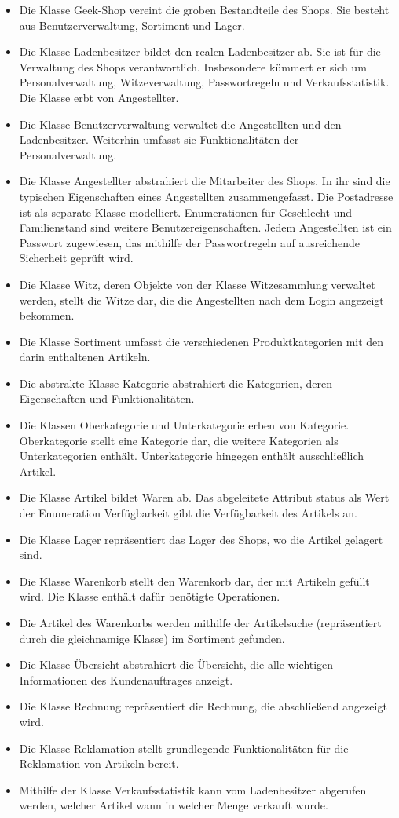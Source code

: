 \documentclass[pdftex,12pt,a4paper]{article}
\begin{document}
\begin{itemize}
\item Die Klasse Geek-Shop vereint die groben Bestandteile des Shops. Sie besteht aus Benutzerverwaltung, Sortiment und Lager.
\item Die Klasse Ladenbesitzer bildet den realen Ladenbesitzer ab. Sie ist für die Verwaltung des Shops verantwortlich. Insbesondere kümmert er sich um Personalverwaltung, Witzeverwaltung, Passwortregeln und Verkaufsstatistik. Die Klasse erbt von Angestellter.
\item Die Klasse Benutzerverwaltung verwaltet die Angestellten und den Ladenbesitzer. Weiterhin umfasst sie Funktionalit\"aten der Personalverwaltung.
\item Die Klasse Angestellter abstrahiert die Mitarbeiter des Shops. In ihr sind die typischen Eigenschaften eines Angestellten zusammengefasst. Die Postadresse ist als separate Klasse modelliert. Enumerationen f\"ur Geschlecht und Familienstand sind weitere Benutzereigenschaften. Jedem Angestellten ist ein Passwort zugewiesen, das mithilfe der Passwortregeln auf ausreichende Sicherheit gepr\"uft wird.
\item Die Klasse Witz, deren Objekte von der Klasse Witzesammlung verwaltet werden, stellt die Witze dar, die die Angestellten nach dem Login angezeigt bekommen.
\item Die Klasse Sortiment umfasst die verschiedenen Produktkategorien mit den darin enthaltenen Artikeln.
\item Die abstrakte Klasse Kategorie abstrahiert die Kategorien, deren Eigenschaften und Funktionalitäten.
\item Die Klassen Oberkategorie und Unterkategorie erben von Kategorie. Oberkategorie stellt eine Kategorie dar, die weitere Kategorien als Unterkategorien enthält. Unterkategorie hingegen enthält ausschließlich Artikel.
\item Die Klasse Artikel bildet Waren ab. Das abgeleitete Attribut status als Wert der Enumeration Verfügbarkeit gibt die Verfügbarkeit des Artikels an.
\item Die Klasse Lager repräsentiert das Lager des Shops, wo die Artikel gelagert sind.
\item Die Klasse Warenkorb stellt den Warenkorb dar, der mit Artikeln gefüllt wird. Die Klasse enthält dafür benötigte Operationen.
\item Die Artikel des Warenkorbs werden mithilfe der Artikelsuche (repräsentiert durch die gleichnamige Klasse) im Sortiment gefunden.
\item Die Klasse Übersicht abstrahiert die Übersicht, die alle wichtigen Informationen des Kundenauftrages anzeigt.
\item Die Klasse Rechnung repräsentiert die Rechnung, die abschließend angezeigt wird.
\item Die Klasse Reklamation stellt grundlegende Funktionalitäten für die Reklamation von Artikeln bereit.
\item Mithilfe der Klasse Verkaufsstatistik kann vom Ladenbesitzer abgerufen werden, welcher Artikel wann in welcher Menge verkauft wurde.
\end{itemize}
\end{document}
